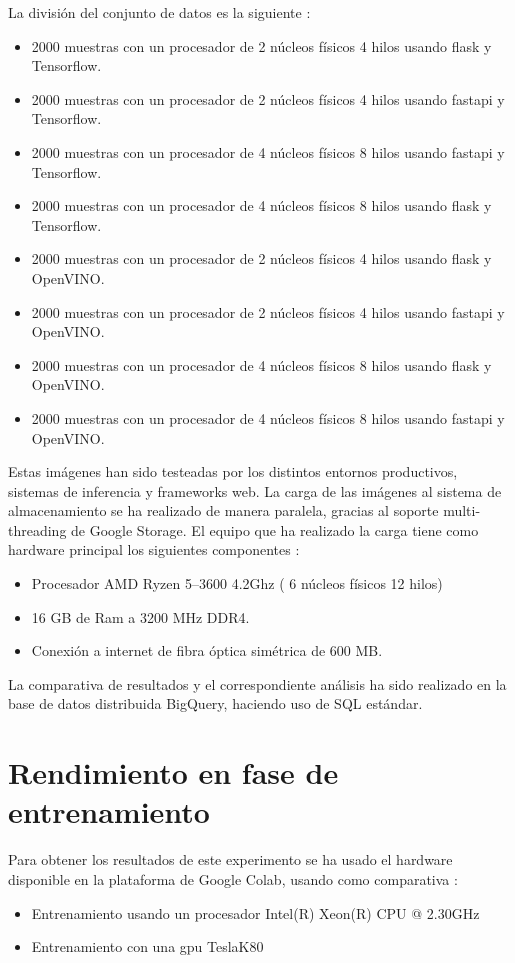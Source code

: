 La división del conjunto de datos es la siguiente :
\begin{itemize}
    \item 2000 muestras con un procesador de 2 núcleos físicos 4 hilos usando flask y Tensorflow.
    \item 2000 muestras con un procesador de 2 núcleos físicos 4 hilos usando fastapi y Tensorflow.
    \item 2000 muestras con un procesador de 4 núcleos físicos 8 hilos usando fastapi y Tensorflow.
    \item 2000 muestras con un procesador de 4 núcleos físicos 8 hilos usando flask y Tensorflow.
    \item 2000 muestras con un procesador de 2 núcleos físicos 4 hilos usando flask y OpenVINO\@.
    \item 2000 muestras con un procesador de 2 núcleos físicos 4 hilos usando fastapi y OpenVINO\@.
    \item 2000 muestras con un procesador de 4 núcleos físicos 8 hilos usando flask y OpenVINO\@.
    \item 2000 muestras con un procesador de 4 núcleos físicos 8 hilos usando fastapi y OpenVINO\@.
\end{itemize}
Estas imágenes han sido testeadas por los distintos entornos productivos, sistemas de inferencia y frameworks web.
La carga de las imágenes al sistema de almacenamiento se ha realizado de manera paralela, gracias al soporte multi-threading de Google Storage.
El equipo que ha realizado la carga tiene como hardware principal los siguientes componentes :
\begin{itemize}
    \item Procesador AMD Ryzen 5--3600 4.2Ghz ( 6 núcleos físicos 12 hilos)
    \item 16 GB de Ram a 3200 MHz DDR4.
    \item Conexión a internet de fibra óptica simétrica de 600 MB\@.
\end{itemize}
La comparativa de resultados y el correspondiente análisis ha sido realizado en la base de datos distribuida BigQuery, haciendo uso de SQL estándar.


\section{Rendimiento en fase de entrenamiento}\label{sec:rendimiento-en-fase-de-entrenamiento}
Para obtener los resultados de este experimento se ha usado el hardware disponible en la plataforma de Google Colab, usando como comparativa :
\begin{itemize}
    \item Entrenamiento usando un procesador Intel(R) Xeon(R) CPU @ 2.30GHz
    \item Entrenamiento con una gpu TeslaK80
\end{itemize}

